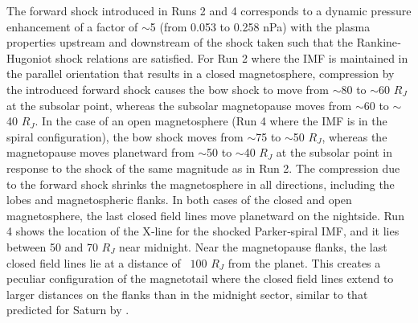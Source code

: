 The forward shock introduced in Runs 2 and 4 corresponds to a dynamic pressure enhancement of a factor of $\sim$5 (from 0.053 to 0.258 nPa) with the plasma properties upstream and downstream of the shock taken such that the Rankine‐Hugoniot shock relations are satisfied. For Run 2 where the IMF is maintained in the parallel orientation that results in a closed magnetosphere, compression by the introduced forward shock causes the bow shock to move from $\sim$80 to $\sim$60 $R_J$ at the subsolar point, whereas the subsolar magnetopause moves from $\sim$60 to $\sim$40 $R_J$. In the case of an open magnetosphere (Run 4 where the IMF is in the spiral configuration), the bow shock moves from $\sim$75 to $\sim$50 $R_J$, whereas the magnetopause moves planetward from $\sim$50 to $\sim$40 $R_J$ at the subsolar point in response to the shock of the same magnitude as in Run 2. The compression due to the forward shock shrinks the magnetosphere in all directions, including the lobes and magnetospheric flanks. In both cases of the closed and open magnetosphere, the last closed field lines move planetward on the nightside. Run 4 shows the location of the X‐line for the shocked Parker‐spiral IMF, and it lies between 50 and 70 $R_J$ near midnight. Near the magnetopause flanks, the last closed field lines lie at a distance of ~$100$ $R_J$ from the planet. This creates a peculiar configuration of the magnetotail where the closed field lines extend to larger distances on the flanks than in the midnight sector, similar to that predicted for Saturn by \cite{Jia2012}.

